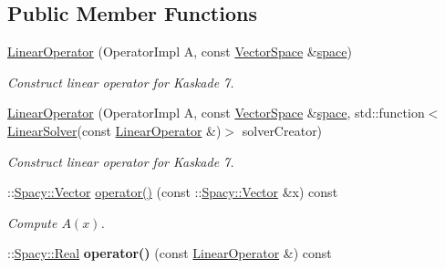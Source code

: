 \subsection*{Public Member Functions}
\begin{DoxyCompactItemize}
\item 
\hyperlink{classSpacy_1_1Kaskade_1_1LinearOperator_a24acb8f5c16194484d4afe5777a5aea5}{Linear\+Operator} (Operator\+Impl A, const \hyperlink{classSpacy_1_1VectorSpace}{Vector\+Space} \&\hyperlink{classSpacy_1_1VectorBase_aa999dbf9d679d895dfe04c10fbf9f5e9}{space})
\begin{DoxyCompactList}\small\item\em Construct linear operator for Kaskade 7. \end{DoxyCompactList}\item 
\hyperlink{classSpacy_1_1Kaskade_1_1LinearOperator_a5c287f9cae480a07428e49af70875b7a}{Linear\+Operator} (Operator\+Impl A, const \hyperlink{classSpacy_1_1VectorSpace}{Vector\+Space} \&\hyperlink{classSpacy_1_1VectorBase_aa999dbf9d679d895dfe04c10fbf9f5e9}{space}, std\+::function$<$ \hyperlink{namespaceSpacy_adcd0d78166a9c972b8a2e5a689fc2d03}{Linear\+Solver}(const \hyperlink{classSpacy_1_1Kaskade_1_1LinearOperator}{Linear\+Operator} \&)$>$ solver\+Creator)
\begin{DoxyCompactList}\small\item\em Construct linear operator for Kaskade 7. \end{DoxyCompactList}\item 
\+::\hyperlink{classSpacy_1_1Vector}{Spacy\+::\+Vector} \hyperlink{classSpacy_1_1Kaskade_1_1LinearOperator_added0f85104ded29f4c87992f5b5a81b}{operator()} (const \+::\hyperlink{classSpacy_1_1Vector}{Spacy\+::\+Vector} \&x) const \hypertarget{classSpacy_1_1Kaskade_1_1LinearOperator_added0f85104ded29f4c87992f5b5a81b}{}\label{classSpacy_1_1Kaskade_1_1LinearOperator_added0f85104ded29f4c87992f5b5a81b}

\begin{DoxyCompactList}\small\item\em Compute $A(x)$. \end{DoxyCompactList}\item 
\+::\hyperlink{classSpacy_1_1Real}{Spacy\+::\+Real} {\bfseries operator()} (const \hyperlink{classSpacy_1_1Kaskade_1_1LinearOperator}{Linear\+Operator} \&) const \hypertarget{classSpacy_1_1Kaskade_1_1LinearOperator_af787d5f0a939baeaca4732fcbb7698ad}{}\label{classSpacy_1_1Kaskade_1_1LinearOperator_af787d5f0a939baeaca4732fcbb7698ad}


\end{DoxyCompactItemize}

